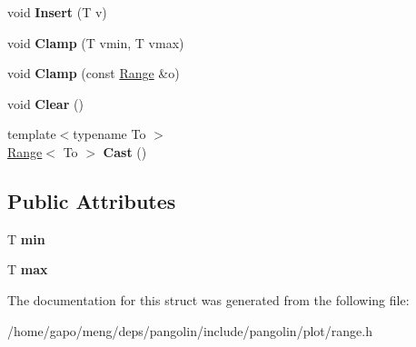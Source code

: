 \begin{DoxyCompactItemize}
\item 
void {\bfseries Insert} (T v)\hypertarget{structpangolin_1_1_range_a35b7256dfcdf8ecfbd5b71b46181e7cc}{}\label{structpangolin_1_1_range_a35b7256dfcdf8ecfbd5b71b46181e7cc}

\item 
void {\bfseries Clamp} (T vmin, T vmax)\hypertarget{structpangolin_1_1_range_afb2b0897bb07ceff15bb9f8ae469d4b0}{}\label{structpangolin_1_1_range_afb2b0897bb07ceff15bb9f8ae469d4b0}

\item 
void {\bfseries Clamp} (const \hyperlink{structpangolin_1_1_range}{Range} \&o)\hypertarget{structpangolin_1_1_range_a3b3bf7b1f9b247c06e1e3632454ae1af}{}\label{structpangolin_1_1_range_a3b3bf7b1f9b247c06e1e3632454ae1af}

\item 
void {\bfseries Clear} ()\hypertarget{structpangolin_1_1_range_ad8b61e9ea4c7dd05b4e361e971c0e364}{}\label{structpangolin_1_1_range_ad8b61e9ea4c7dd05b4e361e971c0e364}

\item 
{\footnotesize template$<$typename To $>$ }\\\hyperlink{structpangolin_1_1_range}{Range}$<$ To $>$ {\bfseries Cast} ()\hypertarget{structpangolin_1_1_range_aa9f8526131baf0ce0cce59a6542b6948}{}\label{structpangolin_1_1_range_aa9f8526131baf0ce0cce59a6542b6948}

\end{DoxyCompactItemize}
\subsection*{Public Attributes}
\begin{DoxyCompactItemize}
\item 
T {\bfseries min}\hypertarget{structpangolin_1_1_range_af490e89dcf64b2afec94a823069b14cb}{}\label{structpangolin_1_1_range_af490e89dcf64b2afec94a823069b14cb}

\item 
T {\bfseries max}\hypertarget{structpangolin_1_1_range_ac81b20be20857a8f5e58689f382c06d7}{}\label{structpangolin_1_1_range_ac81b20be20857a8f5e58689f382c06d7}

\end{DoxyCompactItemize}


The documentation for this struct was generated from the following file\+:\begin{DoxyCompactItemize}
\item 
/home/gapo/meng/deps/pangolin/include/pangolin/plot/range.\+h\end{DoxyCompactItemize}
